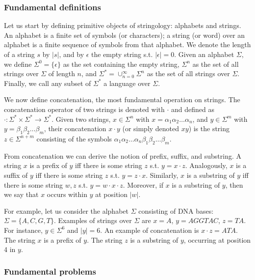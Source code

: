 \subsubsection{Fundamental definitions}

Let us start by defining primitive objects of stringology: alphabets and strings. An alphabet is a finite set of symbols (or characters); a string (or word) over an alphabet is a finite sequence of symbols from that alphabet. We denote the length of a string $s$ by $\left| s \right|$, and by $\epsilon$ the empty string s.t. $\left| \epsilon \right|=0$.
Given an alphabet $\Sigma$, we define $\Sigma^0=\{ \epsilon \}$ as the set containing the empty string, $\Sigma^n$ as the set of all strings over $\Sigma$ of length $n$, and $\Sigma^* = \cup_{n=0}^{\infty}{\Sigma^n}$ as the set of all strings over $\Sigma$. Finally, we call any subset of $\Sigma^*$ a language over $\Sigma$.

We now define concatenation, the most fundamental operation on strings. The concatenation operator of two strings is denoted with $\cdot$ and defined as $\cdot : \Sigma^* \times \Sigma^* \rightarrow \Sigma^*$. Given two strings, $x \in \Sigma^n$ with $x=\alpha_1\alpha_2\dots\alpha_n$, and $y \in \Sigma^m$ with $y=\beta_1\beta_2\dots\beta_m$, their concatenation $x \cdot y$ (or simply denoted $xy$) is the string $z \in \Sigma^{n+m}$ consisting of the symbols $\alpha_1\alpha_2\dots\alpha_n\beta_1\beta_2\dots\beta_m$.

From concatenation we can derive the notion of prefix, suffix, and substring.
A string $x$ is a prefix of $y$ iff there is some string $z$ s.t. $y=x\cdot z$.
Analogously, $x$ is a suffix of $y$ iff there is some string $z$ s.t. $y=z\cdot x$.
Similarly, $x$ is a substring of $y$ iff there is some string $w,z$ s.t. $y=w\cdot x \cdot z$.
Moreover, if $x$ is a substring of $y$, then we say that $x$ occurs within $y$ at position $|w|$.

For example, let us consider the alphabet $\Sigma$ consisting of DNA bases: $\Sigma = \{A,C,G,T\}$. Examples of strings over $\Sigma$ are $x=A$, $y=AGGTAC$, $z=TA$. For instance, $y \in \Sigma^6$ and $\left| y \right| = 6$. An example of concatenation is $x \cdot z = ATA$. The string $x$ is a prefix of $y$. The string $z$ is a substring of $y$, occurring at position 4 in $y$.

\subsubsection{Fundamental problems}

